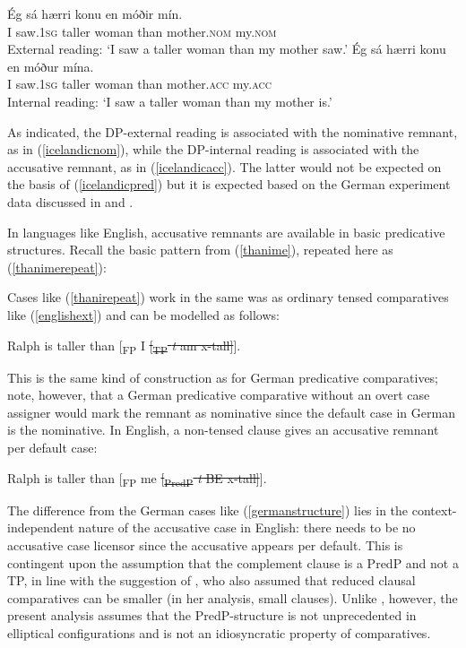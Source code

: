\ea \label{icelandicnomacc}
\ea \gll Ég sá hærri konu en móðir mín. \label{icelandicnom}\\
I saw.\textsc{1sg} taller woman than mother.\textsc{nom} my.\textsc{nom}\\
\glt External reading: `I saw a taller woman than my mother saw.'
\ex \gll Ég sá hærri konu en móður mína. \label{icelandicacc}\\
I saw.\textsc{1sg} taller woman than mother.\textsc{acc} my.\textsc{acc}\\
\glt Internal reading: `I saw a taller woman than my mother is.'
\z
\z

As indicated, the DP-external reading is associated with the nominative remnant, as in (\ref{icelandicnom}), while the DP-internal reading is associated with the accusative remnant, as in (\ref{icelandicacc}). The latter would not be expected on the basis of (\ref{icelandicpred}) but it is expected based on the German experiment data discussed in  and .

In languages like English, accusative remnants are available in basic predicative structures. Recall the basic pattern from (\ref{thanime}), repeated here as (\ref{thanimerepeat}):

\ea \label{thanimerepeat}
\z
\z

Cases like (\ref{thanirepeat}) work in the same was as ordinary tensed comparatives like (\ref{englishext}) and can be modelled as follows:

\ea Ralph is taller than [\textsubscript{FP} I \sout{[\textsubscript{TP} \textit{t} am x-tall]}].
\z

This is the same kind of construction as for German predicative comparatives; note, however, that a German predicative comparative without an overt case assigner would mark the remnant as nominative since the default case in German is the nominative. In English, a non-tensed clause gives an accusative remnant per default case:

\ea Ralph is taller than [\textsubscript{FP} me \sout{[\textsubscript{PredP} \textit{t} BE x-tall]}].
\z

The difference from the German cases like (\ref{germanstructure}) lies in the context-independent nature of the accusative case in English: there needs to be no accusative case licensor since the accusative appears per default. This is contingent upon the assumption that the complement clause is a PredP and not a TP, in line with the suggestion of \citet{pancheva2006}, who also assumed that reduced clausal comparatives can be smaller (in her analysis, small clauses). Unlike \citet{pancheva2006}, however, the present analysis assumes that the PredP-structure is not unprecedented in elliptical configurations and is not an idiosyncratic property of comparatives.

